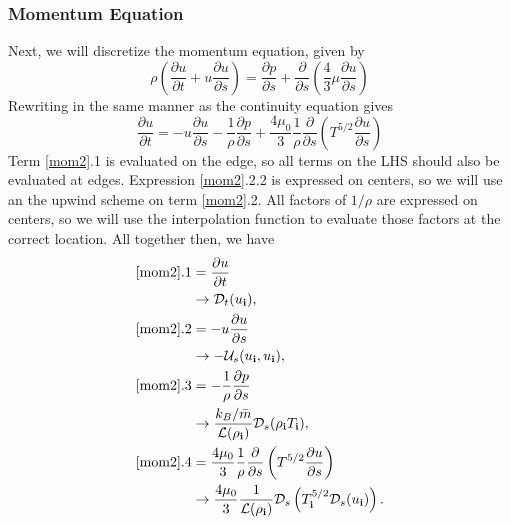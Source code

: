\documentclass[iop]{emulateapj}
\begin{document}
				\subsubsection{Momentum Equation}
					Next, we will discretize the momentum equation, given by
					\begin{equation}
						\rho \left( \frac{\partial u}{\partial t} + u \frac{\partial u}{\partial s} \right) = \frac{\partial p}{\partial s} + \frac{\partial}{\partial s} \left( \frac{4}{3} \mu \frac{\partial u}{\partial s} \right) \nonumber
					\end{equation}
					Rewriting in the same manner as the continuity equation gives
					\begin{equation}
						\frac{\partial u}{\partial t} = -u \frac{\partial u}{\partial s} - \frac{1}{\rho} \frac{\partial p}{\partial s} + \frac{4 \mu_0}{3} \frac{1}{\rho} \frac{\partial}{\partial s} \left( T^{5/2} \frac{\partial u}{\partial s} \right) \label{mom2}
					\end{equation}
					Term \ref{mom2}.1 is evaluated on the edge, so all terms on the LHS should also be evaluated at edges. Expression \ref{mom2}.2.2 is expressed on centers, so we will use an the upwind scheme on term \ref{mom2}.2. All factors of $1/\rho$ are expressed on centers, so we will use the interpolation function to evaluate those factors at the correct location. All together then, we have
					\begin{align}
						\ref{mom2}.1 &= \frac{\partial u}{\partial t} \nonumber \\ &\rightarrow \mathcal{D}_t(u_{\mathbf{i}}), \\
						\ref{mom2}.2 &= -u \frac{\partial u}{\partial s} \nonumber \\ &\rightarrow - \mathcal{U}_s(u_{\mathbf{i}}, u_{\mathbf{i}}), \\
						\ref{mom2}.3 &= -\frac{1}{\rho} \frac{\partial p}{\partial s} \nonumber \\ &\rightarrow \frac{k_B / \bar{m}}{\mathcal{L}(\rho_{\mathbf{i}})} \mathcal{D}_s(\rho_{\mathbf{i}} T_{\mathbf{i}}), \\
						\ref{mom2}.4 &=  \frac{4 \mu_0}{3} \frac{1}{\rho} \frac{\partial}{\partial s} \left( T^{5/2} \frac{\partial u}{\partial s} \right) \nonumber \\ &\rightarrow  \frac{4 \mu_0}{3}  \frac{1}{\mathcal{L}(\rho_{\mathbf{i}})} \mathcal{D}_s\left( T_{\mathbf{i}}^{5/2} \mathcal{D}_s(u_{\mathbf{i}}) \right).
					\end{align}
					
\end{document}
